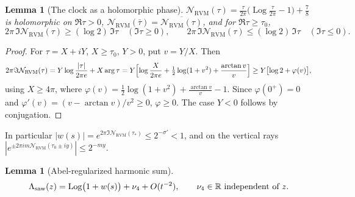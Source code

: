 \documentclass[11pt,reqno]{amsart}
\numberwithin{equation}{section}
\theoremstyle{plain}
\newtheorem{lemma}[theorem]{Lemma}
\theoremstyle{definition}
\theoremstyle{remark}
\newcommand{\R}{\mathbb R}
\newcommand{\Log}{\operatorname{Log}}
\newcommand{\RVM}{\mathrm{RVM}}
\newcommand{\NR}{\mathcal N_{\RVM}}
\begin{document}
\begin{lemma}[The clock as a holomorphic phase]\label{lem:TR-clock}
$\NR(\tau)=\frac\tau{2\pi}\bigl(\Log\frac\tau{2\pi}-1\bigr)+\frac78$ is holomorphic on $\Re\tau>0$, $\NR(\bar\tau)=\overline{\NR(\tau)}$, and for $\Re\tau\ge\tau_0$,
\begin{equation}\label{eq:clock-halfplane-bound}
 2\pi\,\Im\NR(\tau)\ge(\log2)\,\Im\tau\quad(\Im\tau\ge0),\qquad
 2\pi\,\Im\NR(\tau)\le(\log2)\,\Im\tau\quad(\Im\tau\le0).
\end{equation}
\end{lemma}

\begin{proof}
For $\tau=X+iY$, $X\ge\tau_0$, $Y>0$, put $v=Y/X$.  Then
\begin{equation}\label{eq:clock-im-identity}
 2\pi\Im\NR(\tau)=Y\log\frac{|\tau|}{2\pi e}+X\arg\tau
 =Y\Bigl[\log\frac{X}{2\pi e}+\tfrac12\log(1+v^2)+\frac{\arctan v}v\Bigr]\ge Y\bigl[\log2+\varphi(v)\bigr],
\end{equation}
using $X\ge4\pi$, where $\varphi(v)=\frac12\log(1+v^2)+\frac{\arctan v}v-1$.  Since $\varphi(0^+)=0$ and $\varphi'(v)=(v-\arctan v)/v^2\ge0$, $\varphi\ge0$.  The case $Y<0$ follows by conjugation.
\end{proof}

In particular $|w(s)|=e^{2\pi\Im\NR(\tau_*)}\le2^{-\sigma'}<1$, and on the vertical rays $|e^{\pm2\pi im\NR(\tau_0\pm iy)}|\le2^{-my}$.

\begin{lemma}[Abel-regularized harmonic sum]\label{lem:TR-harmonic}
\begin{equation}\label{eq:Psi-asymp}
 \Lambda_{\rm saw}(z)=\Log\bigl(1+w(s)\bigr)+\nu_4+O(t^{-2}),\qquad\nu_4\in\R\ \text{independent of }z .
\end{equation}
\end{lemma}
\end{document}
